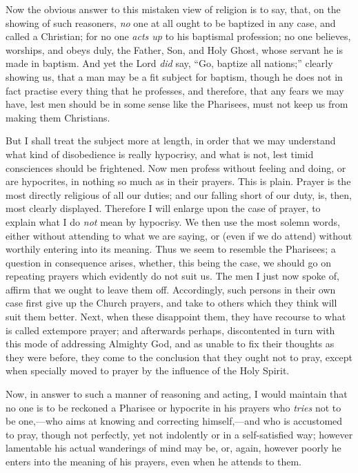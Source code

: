 Now the obvious answer to this mistaken view of
religion is to say, that, on the showing of such
reasoners, \emph{no} one at all ought to be baptized in
any case, and called a Christian; for no one \emph{acts up}
to his baptismal profession; no one believes, worships,
and obeys duly, the Father, Son, and Holy Ghost, whose
servant he is made in baptism. And yet the Lord \emph{did}
say, ``Go, baptize all nations;'' clearly showing
us, that a man may be a fit subject for baptism, though
he does not in fact practise every thing that he
professes, and therefore, that any fears we may have,
lest men should be in some sense like the Pharisees, must
not keep us from making them Christians.

But I shall treat the subject more at length, in order
that we may understand what kind of disobedience is
really hypocrisy, and what is not, lest timid consciences should be frightened. Now men profess without feeling and
doing, or are hypocrites, in nothing so much as in their
prayers. This is plain. Prayer is the most directly
religious of all our duties; and our falling short of our
duty, is, then, most clearly displayed. Therefore I will
enlarge upon the case of prayer, to explain what I do \emph{not}
mean by hypocrisy. We then use the most solemn words,
either without attending to what we are saying, or (even
if we do attend) without worthily entering into its
meaning. Thus we seem to resemble the Pharisees; a
question in consequence arises, whether, this being the
case, we should go on repeating prayers which evidently
do not suit us. The men I just now spoke of, affirm that
we ought to leave them off. Accordingly, such persons in
their own case first give up the Church prayers, and take
to others which they think will suit them better. Next,
when these disappoint them, they have recourse to what is
called extempore prayer; and afterwards perhaps,
discontented in turn with this mode of addressing
Almighty God, and as unable to fix their thoughts as they
were before, they come to the conclusion that they ought
not to pray, except when specially moved to prayer by the
influence of the Holy Spirit.

Now, in answer to such a manner of reasoning and
acting, I would maintain that no one is to be reckoned a
Pharisee or hypocrite in his prayers who \emph{tries}
not to be one,—who aims at knowing and correcting
himself,—and who is accustomed to pray, though not
perfectly, yet not indolently or in a self-satisfied way;
however lamentable his actual wanderings of mind may be,
or, again, however poorly he enters into the meaning of
his prayers, even when he attends to them.

